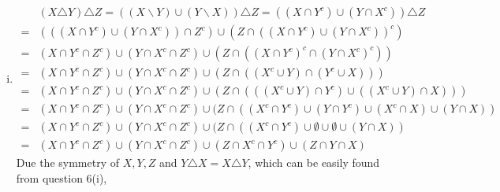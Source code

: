\documentclass{article}[12pt]
\begin{document}
\begin{enumerate}[(i)]
\item 
\begin{align*}
&(X \triangle Y) \triangle Z= ((X \backslash Y) \cup(Y \backslash X))\triangle Z=((X \cap Y^c) \cup(Y \cap X^c))\triangle Z\\
=& (((X \cap Y^c) \cup(Y \cap X^c))\cap Z^c) \cup (Z\cap((X \cap Y^c) \cup(Y \cap X^c))^c)\\
=& (X \cap Y^c\cap Z^c)\cup (Y \cap X^c\cap Z^c)\cup (Z\cap ((X \cap Y^c)^c\cap (Y \cap X^c)^c))\\
=& (X \cap Y^c\cap Z^c)\cup (Y \cap X^c\cap Z^c)\cup (Z\cap ((X^c \cup Y)\cap (Y^c \cup X)))\\
=& (X \cap Y^c\cap Z^c)\cup (Y \cap X^c\cap Z^c)\cup (Z\cap (((X^c \cup Y)\cap Y^c) \cup ((X^c \cup Y)\cap X)))\\
=& (X \cap Y^c\cap Z^c)\cup (Y \cap X^c\cap Z^c)\cup (Z\cap ((X^c \cap Y^c)\cup (Y\cap Y^c)\cup (X^c\cap X) \cup (Y\cap X))\\
=& (X \cap Y^c\cap Z^c)\cup (Y \cap X^c\cap Z^c)\cup (Z\cap ((X^c \cap Y^c)\cup \emptyset\cup \emptyset \cup (Y\cap X))\\
=& (X \cap Y^c\cap Z^c)\cup (Y \cap X^c\cap Z^c)\cup (Z\cap X^c \cap Y^c) \cup (Z\cap Y\cap X)
\end{align*}
Due the symmetry of $X, Y, Z$ and $Y\triangle X=X\triangle Y$, which can be easily found from question 6(i),
\begin{align*}

\end{align*}
\end{enumerate}
\end{document}
